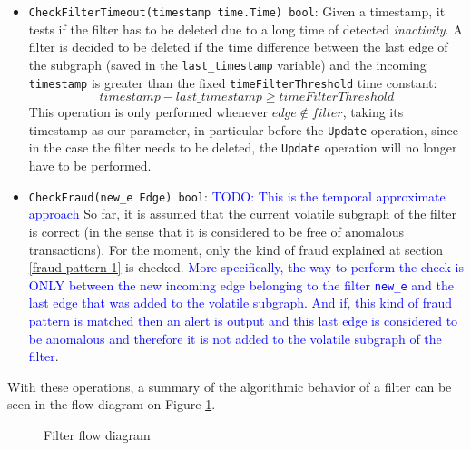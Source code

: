 \begin{graysection}
\begin{itemize}
    \item \texttt{CheckFilterTimeout(timestamp time.Time) bool}: Given a timestamp, it tests if the filter has to be deleted due to a long time of detected \textit{inactivity}. A filter is decided to be deleted if the time difference between the last edge of the subgraph (saved in the \texttt{last\_timestamp} variable) and the incoming \texttt{timestamp} is greater than the fixed \texttt{timeFilterThreshold} time constant: $$timestamp - last\_timestamp \geq timeFilterThreshold$$
    This operation is only performed whenever $edge \notin filter$, taking its timestamp as our parameter, in particular before the \texttt{Update} operation, since in the case the filter needs to be deleted, the \texttt{Update} operation will no longer have to be performed.

    \item \texttt{CheckFraud(new\_e Edge) bool}: \textcolor{blue}{TODO: This is the temporal approximate approach} So far, it is assumed that the current volatile subgraph of the filter is correct (in the sense that it is considered to be free of anomalous transactions). For the moment, only the kind of fraud explained at section \ref{fraud-pattern-1} is checked. \textcolor{blue}{More specifically, the way to perform the check is ONLY between the new incoming edge belonging to the filter \texttt{new\_e} and the last edge that was added to the volatile subgraph. And if, this kind of fraud pattern is matched then an alert is output and this last edge is considered to be anomalous and therefore it is not added to the volatile subgraph of the filter}. 
    
\end{itemize}

With these operations, a summary of the algorithmic behavior of a filter can be seen in the flow diagram on Figure \ref{diag:filter-flow}.

\begin{figure}[H]
    \centering
    
    \caption{Filter flow diagram}
    \label{diag:filter-flow}
\end{figure}


\end{graysection}

